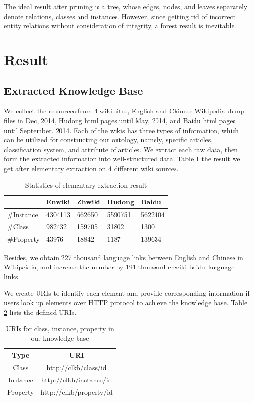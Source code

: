 \documentclass[runningheads,a4paper]{llncs}
\begin{document}
\begin{CJK*}{UTF8}{song}
The ideal result after pruning is a tree, whose edges, nodes, and leaves separately denote relations, classes and instances. However, since getting rid of incorrect entity relations without consideration of integrity, a forest result is inevitable.

\section{Result}
\label{sec:result}

\subsection{Extracted Knowledge Base}
We collect the resources from 4 wiki sites, English and Chinese Wikipedia dump files in Dec, 2014, Hudong html pages until May, 2014, and Baidu html pages until September, 2014. Each of the wikis has three types of information, which can be utilized for constructing our ontology, namely, specific articles, classification system, and attribute of articles. We extract each raw data, then form the extracted information into well-structured data. Table \ref{tab:extract-result} the result we get after elementary extraction on 4 different wiki sources.

\begin{table}[h]
\small
\centering
\caption{Statistics of elementary extraction result}
\label{tab:extract-result}
    \begin{tabular}{|l|l|l|l|l|}
        \hline
                 & Enwiki  & Zhwiki & Hudong  & Baidu   \\ \hline
        \#Instance & 4304113 & 662650 & 5590751 & 5622404 \\ \hline
        \#Class    & 982432  & 159705 & 31802   & 1300    \\ \hline
        \#Property & 43976   & 18842  & 1187    & 139634  \\ \hline
    \end{tabular}
\end{table}

Besides, we obtain 227 thousand language links between English and Chinese in Wikipeidia, and increase the number by 191 thousand enwiki-baidu language links.

We create URIs to identify each element and provide corresponding information if users look up elements over HTTP protocol to achieve the knowledge base. Table \ref{tab:uris} lists the defined URIs.
\begin{table}[h]
\small
\centering
\caption{URIs for class, instance, property in our knowledge base}
\label{tab:uris}
    \begin{tabular}{|c|c|}
        \hline
        Type     & URI                     \\ \hline
        Class    & http://clkb/class/id    \\ \hline
        Instance & http://clkb/instance/id \\ \hline
        Property & http://clkb/property/id \\ \hline
    \end{tabular}
\end{table}


\end{CJK*}
\end{document}

